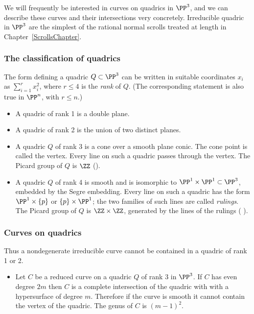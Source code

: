 \begin{example}\label{Div of quadric}
 
 We will frequently be interested in curves on quadrics in $\PP^3$, and we can describe these
curves and their intersections very concretely.
Irreducible quadric in $\PP^{3}$ are the simplest of the rational normal scrolls treated at length
in Chapter~\ref{ScrollsChapter}. 

\subsubsection{The classification of quadrics} The form defining a quadric $Q\subset \PP^{3}$ can be written in suitable
coordinates $x_{i}$ as $\sum_{i=1}^{r} x_{i}^{2}$, where $r\leq 4$ is the \emph{rank} of $Q$. (The corresponding
statement is also true in $\PP^{n}$, with $r\leq n$.)

\begin{itemize}
\item A quadric of rank 1 is a double plane.
\item A quadric of rank 2 is the union of two distinct planes. 
\item A quadric $Q$ of rank 3 is a cone over a smooth plane conic. The cone point is called the vertex. Every line
on such a quadric passes through the vertex. The Picard group of $Q$ is $\ZZ$
(\cite[Exercise II.6.5]{Hartshorne1977}).
\item A quadric $Q$ of rank 4 is smooth and is isomorphic to $\PP^{1}\times \PP^{1} \subset \PP^{3}$, embedded by the Segre embedding. Every line on such a quadric has the form $\PP^{1}\times \{p\}$ or $\{p\} \times \PP^{1}$; the two families of such lines are called \emph{rulings}.
The Picard group of $Q$ is $\ZZ\times \ZZ$, generated by the lines of the rulings (
\cite[Example II.6.1]{Hartshorne1977}).
\end{itemize}

\subsubsection{Curves on quadrics}\label{curves on quadrics}
Thus a nondegenerate irreducible curve cannot be contained in a quadric of rank 1 or 2.
\begin{itemize}
\item Let $C$ be a reduced curve on a quadric $Q$ of rank 3 in $\PP^{3}$. 
If $C$ has even degree $2m$ then $C$ is a complete intersection
of the quadric with with a hypersurface of degree $m$. Therefore if the curve is smooth it cannot contain the vertex of the quadric. The genus of $C$ is $(m-1)^{2}$.


\end{itemize}
\end{example}
